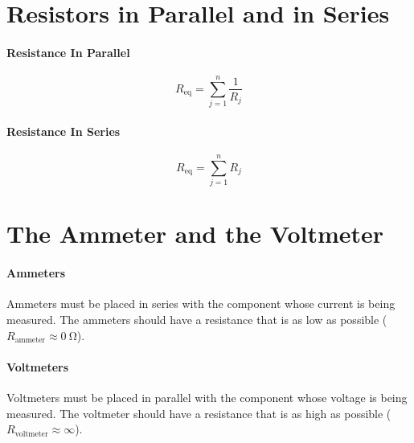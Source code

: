\documentclass{article}
\begin{document}
    \section{Resistors in Parallel and in Series}
        
        \paragraph{Resistance In Parallel}
        \begin{equation}
            R_\text{eq} = \sum_{j=1}^n \frac{1}{R_j}
        \end{equation}

        \paragraph{Resistance In Series}
        \begin{equation}
            R_\text{eq} = \sum_{j=1}^n R_j
        \end{equation}

    \section{The Ammeter and the Voltmeter}

        \paragraph{Ammeters}
        Ammeters must be placed in series with the component whose current is being measured. The ammeters should have a resistance that is as low as possible ($R_\text{ammeter} \approx \SI{0}{\ohm}$).

        \paragraph{Voltmeters}
        Voltmeters must be placed in parallel with the component whose voltage is being measured. The voltmeter should have a resistance that is as high as possible ($R_\text{voltmeter} \approx \infty$).
\end{document}
